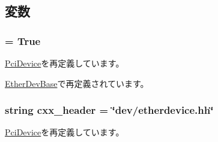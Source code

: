 \subsection{変数}
\hypertarget{classEthernet_1_1EtherDevice_a17fa61ac3806b481cafee5593b55e5d0}{
\subsubsection[{abstract}]{ = True}}
\label{classEthernet_1_1EtherDevice_a17fa61ac3806b481cafee5593b55e5d0}


\hyperlink{classPci_1_1PciDevice_a17fa61ac3806b481cafee5593b55e5d0}{PciDevice}を再定義しています。

\hyperlink{classEthernet_1_1EtherDevBase_a17fa61ac3806b481cafee5593b55e5d0}{EtherDevBase}で再定義されています。\hypertarget{classEthernet_1_1EtherDevice_a17da7064bc5c518791f0c891eff05fda}{
\subsubsection[{cxx\_\-header}]{\setlength{\rightskip}{0pt plus 5cm}string {\bf cxx\_\-header} = \char`\"{}dev/etherdevice.hh\char`\"{}}}
\label{classEthernet_1_1EtherDevice_a17da7064bc5c518791f0c891eff05fda}


\hyperlink{classPci_1_1PciDevice_a17da7064bc5c518791f0c891eff05fda}{PciDevice}を再定義しています。

